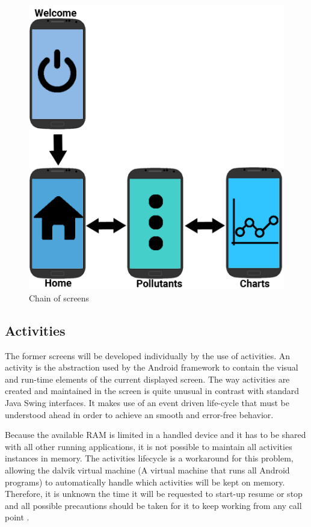 \begin{figure}[H]
\begin{adjustbox}{width=.45\textwidth,center=\textwidth}
  \centering
  \includegraphics[scale=1]{images/screenChain.png}
\end{adjustbox}
  \caption[Chain of screens]{Chain of screens}
  \label{fig:chain_of_screens}
\end{figure}

\subsection{Activities}
The former screens will be developed individually by the use of activities. An activity is the abstraction used by the Android framework to contain the visual and run-time elements of the current displayed screen. The way activities are created and maintained in the screen is quite unusual in contrast with standard Java Swing interfaces. It makes use of an event driven life-cycle that must be understood ahead in order to achieve an smooth and error-free behavior. 

Because the available RAM is limited in a handled device and it has to be shared with all other running applications, it is not possible to maintain  all activities instances in memory. The activities lifecycle is a workaround for this problem, allowing the dalvik virtual machine (A virtual machine that runs all Android programs) to automatically handle which activities will be kept on memory. Therefore, it is unknown the time it will be requested to start-up resume or stop and all possible precautions should be taken for it to keep working from any call point .

